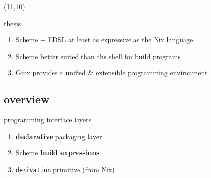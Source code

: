 \documentclass{beamer}
\begin{document}
\begin{frame}
\begin{textblock}{5}
{    }
  \end{textblock}
  
  \begin{textblock}{5}(11,10)
  \end{textblock}
\end{frame}

\begin{frame}{thesis}

  \Large{
    \begin{enumerate}
    \item Scheme + EDSL at least as \alert{expressive} as the Nix
      language
    \item<2-> Scheme better suited than the shell for \alert{build
        programs}
    \item<3-> Guix provides a \alert{unified \& extensible} programming
      environment
    \end{enumerate}
  }    
\end{frame}

\subsection{overview}

\begin{frame}{programming interface layers}

  \large{
    \begin{enumerate}
    \item \alert{\textbf{declarative}} packaging layer
    \item Scheme \alert{\textbf{build expressions}}
    \item \alert{\texttt{derivation}} primitive (from Nix)
    \end{enumerate}
  }
\end{frame}
\end{document}
